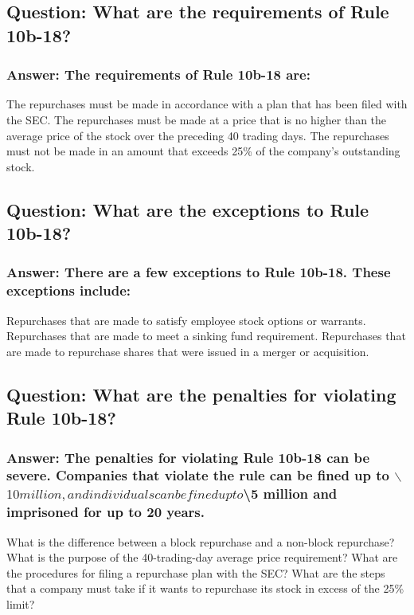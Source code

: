 \documentclass[11pt]{article}
\begin{document}
\subsection{Question: What are the requirements of Rule 10b-18?}
\label{sec:org8b22071}

\subsubsection{Answer: The requirements of Rule 10b-18 are:}
\label{sec:org4e969df}

The repurchases must be made in accordance with a plan that has been filed with the SEC.
The repurchases must be made at a price that is no higher than the average price of the stock over the preceding 40 trading days.
The repurchases must not be made in an amount that exceeds 25\% of the company's outstanding stock.
\subsection{Question: What are the exceptions to Rule 10b-18?}
\label{sec:org1d24984}

\subsubsection{Answer: There are a few exceptions to Rule 10b-18. These exceptions include:}
\label{sec:orgedca0dd}

Repurchases that are made to satisfy employee stock options or warrants.
Repurchases that are made to meet a sinking fund requirement.
Repurchases that are made to repurchase shares that were issued in a merger or acquisition.
\subsection{Question: What are the penalties for violating Rule 10b-18?}
\label{sec:org057085d}

\subsubsection{Answer: The penalties for violating Rule 10b-18 can be severe. Companies that violate the rule can be fined up to $\backslash$$10 million, and individuals can be fined up to $\backslash$$5 million and imprisoned for up to 20 years.}
\label{sec:orgd2506f2}


What is the difference between a block repurchase and a non-block repurchase?
What is the purpose of the 40-trading-day average price requirement?
What are the procedures for filing a repurchase plan with the SEC?
What are the steps that a company must take if it wants to repurchase its stock in excess of the 25\% limit?
\end{document}
